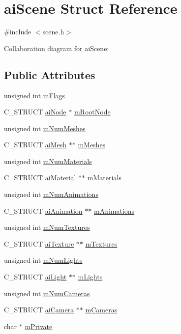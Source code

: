 \hypertarget{structai_scene}{\section{ai\-Scene Struct Reference}
\label{structai_scene}
}


{\ttfamily \#include $<$scene.\-h$>$}



Collaboration diagram for ai\-Scene\-:
\subsection*{Public Attributes}
\begin{DoxyCompactItemize}
\item 
unsigned int \hyperlink{structai_scene_a4091f10bb81e05db00ebc34f40c48f38}{m\-Flags}
\item 
C\-\_\-\-S\-T\-R\-U\-C\-T \hyperlink{structai_node}{ai\-Node} $\ast$ \hyperlink{structai_scene_ad0e9a7e68f2ed6b3120a7c19ef20307a}{m\-Root\-Node}
\item 
unsigned int \hyperlink{structai_scene_a1a6c1abca994c54381a28cc151e5fa4f}{m\-Num\-Meshes}
\item 
C\-\_\-\-S\-T\-R\-U\-C\-T \hyperlink{structai_mesh}{ai\-Mesh} $\ast$$\ast$ \hyperlink{structai_scene_ad1c7000f0f28ea747868db9f94d32a3d}{m\-Meshes}
\item 
unsigned int \hyperlink{structai_scene_a4277d8bffe8b8f568098af6c31d042b7}{m\-Num\-Materials}
\item 
C\-\_\-\-S\-T\-R\-U\-C\-T \hyperlink{structai_material}{ai\-Material} $\ast$$\ast$ \hyperlink{structai_scene_a52bc7089a5b943ad7c7c386e616df35e}{m\-Materials}
\item 
unsigned int \hyperlink{structai_scene_aa2af030ec218ead0dc062b6a96a7471a}{m\-Num\-Animations}
\item 
C\-\_\-\-S\-T\-R\-U\-C\-T \hyperlink{structai_animation}{ai\-Animation} $\ast$$\ast$ \hyperlink{structai_scene_ab76fb8f38c2e7365ccce42d565b62b25}{m\-Animations}
\item 
unsigned int \hyperlink{structai_scene_a0d61a5439edd7223097b48aea57c47dd}{m\-Num\-Textures}
\item 
C\-\_\-\-S\-T\-R\-U\-C\-T \hyperlink{structai_texture}{ai\-Texture} $\ast$$\ast$ \hyperlink{structai_scene_a0fd0d29fbc439e3715b4975ccb68d2d3}{m\-Textures}
\item 
unsigned int \hyperlink{structai_scene_a0c90fc5f15b979e0bb0d3e8f1e246307}{m\-Num\-Lights}
\item 
C\-\_\-\-S\-T\-R\-U\-C\-T \hyperlink{structai_light}{ai\-Light} $\ast$$\ast$ \hyperlink{structai_scene_a2e64a69ade81cae0b3901bea90b6bb47}{m\-Lights}
\item 
unsigned int \hyperlink{structai_scene_a4abc432e1b22a7e01553f33c79c0592f}{m\-Num\-Cameras}
\item 
C\-\_\-\-S\-T\-R\-U\-C\-T \hyperlink{structai_camera}{ai\-Camera} $\ast$$\ast$ \hyperlink{structai_scene_a71e7d204d96969ca4f5a931f4d636f1e}{m\-Cameras}
\item 
char $\ast$ \hyperlink{structai_scene_adc5fcf5c4ef86a45f721560d6c1a4923}{m\-Private}
\end{DoxyCompactItemize}


